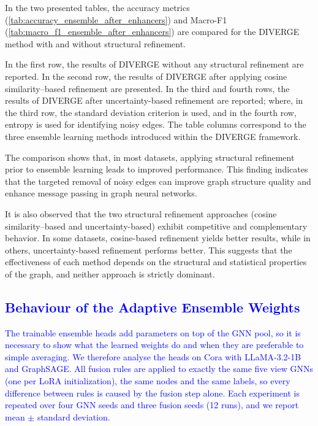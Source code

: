 \documentclass{article}
\newcommand{\revtwo}[1]{\textcolor{blue}{#1}}  %
\begin{document}
In the two presented tables, the accuracy metrics
(\ref{tab:accuracy_ensemble_after_enhancers})
and Macro-F1
(\ref{tab:macro_f1_ensemble_after_enhancers})
are compared for the DIVERGE method with and without structural refinement.

In the first row, the results of DIVERGE without any structural refinement are reported.
In the second row, the results of DIVERGE after applying cosine similarity–based refinement are presented.
In the third and fourth rows, the results of DIVERGE after uncertainty-based refinement are reported; where, in the third row, the standard deviation criterion is used, and in the fourth row, entropy is used for identifying noisy edges. The table columns correspond to the three ensemble learning methods introduced within the DIVERGE framework.

The comparison shows that, in most datasets, applying structural refinement prior to ensemble learning leads to improved performance. This finding indicates that the targeted removal of noisy edges can improve graph structure quality and enhance message passing in graph neural networks.

It is also observed that the two structural refinement approaches (cosine similarity–based and uncertainty-based) exhibit competitive and complementary behavior. In some datasets, cosine-based refinement yields better results, while in others, uncertainty-based refinement performs better. This suggests that the effectiveness of each method depends on the structural and statistical properties of the graph, and neither approach is strictly dominant.

\subsection{\revtwo{Behaviour of the Adaptive Ensemble Weights}}
\label{sec:ensemble_weight_analysis}

\revtwo{The trainable ensemble heads add parameters on top of the GNN pool, so it is necessary to show what the learned weights do and when they are preferable to simple averaging. We therefore analyse the heads on Cora with LLaMA-3.2-1B and GraphSAGE. All fusion rules are applied to exactly the same five view GNNs (one per LoRA initialization), the same nodes and the same labels, so every difference between rules is caused by the fusion step alone. Each experiment is repeated over four GNN seeds and three fusion seeds (12 runs), and we report mean $\pm$ standard deviation.}
\end{document}
